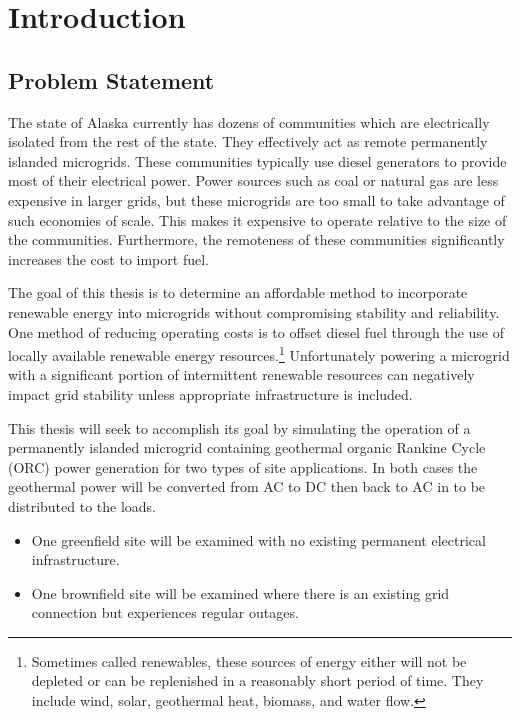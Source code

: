 \chapter{Introduction}
\label{ch:intro}

\section{Problem Statement}
The state of Alaska currently has dozens of communities which are electrically isolated from the rest of the state. They effectively act as remote permanently islanded microgrids. These communities typically use diesel generators to provide most of their electrical power. Power sources such as coal or natural gas are less expensive in larger grids, but these microgrids are too small to take advantage of such economies of scale. This makes it expensive to operate relative to the size of the communities. Furthermore, the remoteness of these communities significantly increases the cost to import fuel.

The goal of this thesis is to determine an affordable method to incorporate renewable energy into microgrids without compromising stability and reliability. One method of reducing operating costs is to offset diesel fuel through the use of locally available renewable energy resources.\footnote{Sometimes called renewables, these sources of energy either will not be depleted or can be replenished in a reasonably short period of time. They include wind, solar, geothermal heat, biomass, and water flow.} Unfortunately powering a microgrid with a significant portion of intermittent renewable resources can negatively impact grid stability unless appropriate infrastructure is included. 

This thesis will seek to accomplish its goal by simulating the operation of a permanently islanded microgrid containing geothermal organic Rankine Cycle (ORC) power generation for two types of site applications. In both cases the geothermal power will be converted from AC to DC then back to AC in to be distributed to the loads.
\begin{itemize}
\item One greenfield site will be examined with no existing permanent electrical infrastructure.
\item One brownfield site will be examined where there is an existing grid connection but experiences regular outages.
\end{itemize}

